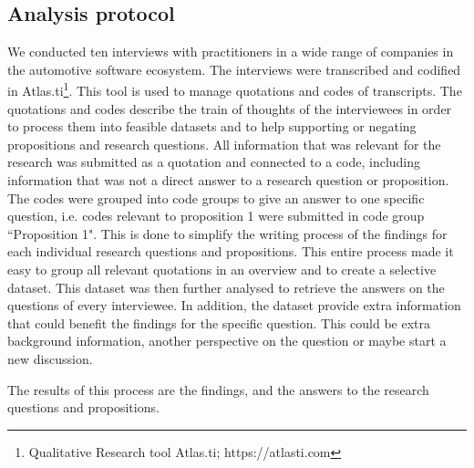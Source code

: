 \subsection{Analysis protocol}
We conducted ten interviews with practitioners in a wide range of companies in the automotive software ecosystem. The interviews were transcribed and codified in Atlas.ti\footnote{Qualitative Research tool Atlas.ti; https://atlasti.com}. This tool is used to manage quotations and codes of transcripts. The quotations and codes describe the train of thoughts of the interviewees in order to process them into feasible datasets and to help supporting or negating propositions and research questions. All information that was relevant for the research was submitted as a quotation and connected to a code, including information that was not a direct answer to a research question or proposition. The codes were grouped into code groups to give an answer to one specific question, i.e. codes relevant to proposition 1 were submitted in code group ``Proposition 1". This is done to simplify the writing process of the findings for each individual research questions and propositions. This entire process made it easy to group all relevant quotations in an overview and to create a selective dataset. This dataset was then further analysed to retrieve the answers on the questions of every interviewee. In addition, the dataset provide extra information that could benefit the findings for the specific question. This could be extra background information, another perspective on the question or maybe start a new discussion. 

The results of this process are the findings, and the answers to the research questions and propositions.